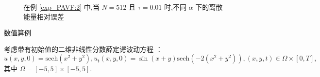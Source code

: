 \documentclass[aspectratio=169]{beamer}
\numberwithin{theorem}{section} %
\begin{document}
\begin{frame}%
	\begin{figure}[H]
		\begin{center}
		  
		\caption{在例 \ref{exp_PAVF:2} 中,当 $N = 512$ 且 $\tau=0.01$ 时,不同 $\alpha$ 下的离散能量相对误差}\label{fig_PAVF:6}
		\end{center}
		\end{figure}
\end{frame}

\begin{frame}{数值算例}
	\begin{example}\label{exp_PAVF:4}
		考虑带有初始值的二维非线性分数薛定谔波动方程 ：
		\begin{equation}\label{eq_PAVF_110}
		u(x,y, 0)=\mbox{sech}\left(x^2+y^2\right), u_t(x,y, 0)=\sin (x+y) \mbox{sech}\left(-2(x^2+y^2)\right), (x,y,t)\in  \Omega\times[0, T],
		\end{equation}
		其中 $\Omega=[-5,5] \times[-5,5]$.
		\end{example}
\end{frame}
\end{document}
